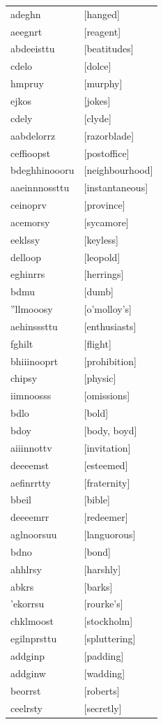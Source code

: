 \documentclass{article}
\begin{document}
\begin{tabular}{ll}
adeghn & [hanged] \\
aeegnrt & [reagent] \\
abdeeisttu & [beatitudes] \\
cdelo & [dolce] \\
hmpruy & [murphy] \\
ejkos & [jokes] \\
cdely & [clyde] \\
aabdelorrz & [razorblade] \\
ceffioopst & [postoffice] \\
bdeghhinoooru & [neighbourhood] \\
aaeinnnossttu & [instantaneous] \\
ceinoprv & [province] \\
acemorsy & [sycamore] \\
eeklssy & [keyless] \\
delloop & [leopold] \\
eghinrrs & [herrings] \\
bdmu & [dumb] \\
''llmooosy & [o'molloy's] \\
aehinsssttu & [enthusiasts] \\
fghilt & [flight] \\
bhiiinooprt & [prohibition] \\
chipsy & [physic] \\
iimnoosss & [omissions] \\
bdlo & [bold] \\
bdoy & [body, boyd] \\
aiiinnottv & [invitation] \\
deeeemst & [esteemed] \\
aefinrrtty & [fraternity] \\
bbeil & [bible] \\
deeeemrr & [redeemer] \\
aglnoorsuu & [languorous] \\
bdno & [bond] \\
ahhlrsy & [harshly] \\
abkrs & [barks] \\
'ekorrsu & [rourke's] \\
chklmoost & [stockholm] \\
egilnprsttu & [spluttering] \\
addginp & [padding] \\
addginw & [wadding] \\
beorrst & [roberts] \\
ceelrsty & [secretly] \\

\end{tabular}
\end{document}
